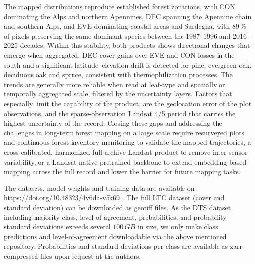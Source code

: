 \documentclass[essd, manuscript]{copernicus}
\begin{document}
The mapped distributions reproduce established forest zonations, with CON dominating the Alps and northern Apennines, DEC spanning the Apennine chain and southern Alps, and EVE dominating coastal areas and Sardegna, with $89\,\%$ of pixels preserving the same dominant species between the 1987--1996 and 2016--2025 decades. Within this stability, both products shows directional changes that emerge when aggregated. DEC cover gains over EVE and CON losses in the south and a significant latitude--elevation drift is detected for pine, evergreen oak, deciduous oak and spruce, consistent with thermophilization processes. The trends are generally more reliable when read at leaf-type and spatially or temporally aggregated scale, filtered by the uncertainty layers. Factors that especially limit the capability of the product, are the geolocation error of the plot observations, and the sparse-observation Landsat 4/5 period that carries the highest uncertainty of the record. Closing these gaps and addressing the challenges in long-term forest mapping on a large scale require resurveyed plots and continuous forest-inventory monitoring to validate the mapped trajectories, a cross-calibrated, harmonized full-archive Landsat product to remove inter-sensor variability, or a Landsat-native pretrained backbone to extend embedding-based mapping across the full record and lower the barrier for future mapping tasks.


\codedataavailability{} %

The datasets, model weights and training data are available on \href{https://researchdata.uibk.ac.at/records/4v6da-v5k69?preview=1&token=eyJhbGciOiJIUzUxMiIsImlhdCI6MTc4OTY0MjEzNCwiZXhwIjoxNzk4Njc1MTk5fQ.eyJpZCI6IjUzZGU1ZmQyLTZlMTYtNDJmNi04MmZiLTdkOTNhYWQ3N2Y3ZSIsImRhdGEiOnt9LCJyYW5kb20iOiJmMmU5ODE4N2Q4YTAxYmZmNGFiYmNjNjBiM2JlYmJiZiJ9.UBZURIGi-v3zZVnmbl3uFxV4SnNuGw8qYMp7zfe8lkaKwDp7gB55QO6zjmnnYj47RGDX4WgYJyLZMIaB67OB5g}{https://doi.org/10.48323/4v6da-v5k69} \citep{hiebl_data_2026}. The full LTC dataset (cover and standard deviation) can be downloaded as geotiff files. As the DTS dataset including majority class, level-of-agreement, probabilities, and probability standard deviations exceeds several $100\,\unit{GB}$ in size, we only make class predictions and level-of-agreement downloadable via the above mentioned repository. Probabilities and standard deviations per class are available as zarr-compressed files upon request at the authors.
\end{document}
